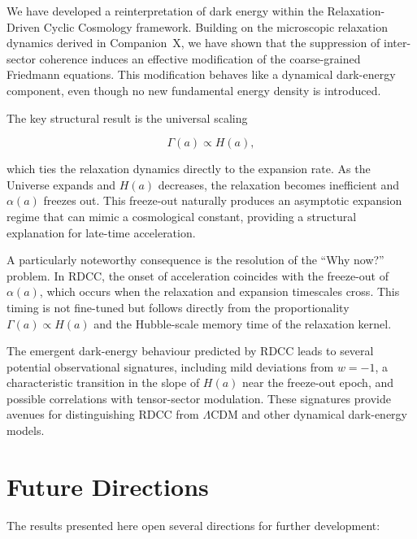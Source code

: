 \documentclass[11pt,a4paper]{article}
\newcommand{\Ha}{H(a)}
\newcommand{\GammaR}{\Gamma}
\newcommand{\alphaR}{\alpha}
\begin{document}
We have developed a reinterpretation of dark energy within the
Relaxation-Driven Cyclic Cosmology framework. Building on the microscopic
relaxation dynamics derived in Companion~X, we have shown that the suppression
of inter-sector coherence induces an effective modification of the
coarse-grained Friedmann equations. This modification behaves like a dynamical
dark-energy component, even though no new fundamental energy density is
introduced.

The key structural result is the universal scaling


\[
\GammaR(a) \propto \Ha,
\]


which ties the relaxation dynamics directly to the expansion rate. As the
Universe expands and $\Ha$ decreases, the relaxation becomes inefficient and
$\alphaR(a)$ freezes out. This freeze-out naturally produces an asymptotic
expansion regime that can mimic a cosmological constant, providing a structural
explanation for late-time acceleration.

A particularly noteworthy consequence is the resolution of the ``Why now?''
problem. In RDCC, the onset of acceleration coincides with the freeze-out of
$\alphaR(a)$, which occurs when the relaxation and expansion timescales cross.
This timing is not fine-tuned but follows directly from the proportionality
$\GammaR(a) \propto \Ha$ and the Hubble-scale memory time of the relaxation
kernel.

The emergent dark-energy behaviour predicted by RDCC leads to several potential
observational signatures, including mild deviations from $w = -1$, a
characteristic transition in the slope of $H(a)$ near the freeze-out epoch, and
possible correlations with tensor-sector modulation. These signatures provide
avenues for distinguishing RDCC from $\Lambda$CDM and other dynamical
dark-energy models.




\section*{Future Directions}

The results presented here open several directions for further development:
\end{document}
